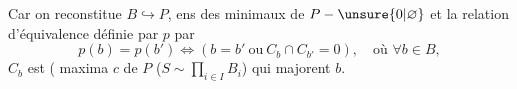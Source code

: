 Car on reconstitue \(B\hookrightarrow P\), ens des  minimaux de \(P-\unsure{0|\varnothing}\)\deleted{\unsure{\(\}\)}}  et la relation d'équivalence définie par \(p\) par
\[p(b)=p(b')\Longleftrightarrow(b=b'\ \text{ou}\ C_b\cap C_{b'}=0),\quad\text{où }\forall b\in B,\]
\(C_b\) est   ( maxima \(c\) de \(P\) (\(S\sim\prod_{i\in I} B_i\))  qui majorent \(b\).
